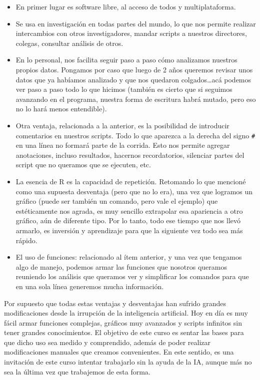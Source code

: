 \documentclass[
]{article}
\providecommand{\tightlist}{%
  \setlength{\itemsep}{0pt}\setlength{\parskip}{0pt}}
\begin{document}
\begin{itemize}
\tightlist
\item
  En primer lugar es software libre, al acceso de todos y
  multiplataforma.
\item
  Se usa en investigación en todas partes del mundo, lo que nos permite
  realizar intercambios con otros investigadores, mandar scripts a
  nuestros directores, colegas, consultar análisis de otros.
\item
  En lo personal, nos facilita seguir paso a paso cómo analizamos
  nuestros propios datos. Pongamos por caso que luego de 2 años queremos
  revisar unos datos que ya habíamos analizado y que nos quedaron
  colgados\ldots acá podemos ver paso a paso todo lo que hicimos
  (también es cierto que si seguimos avanzando en el programa, nuestra
  forma de escritura habrá mutado, pero eso no lo hará menos
  entendible).
\item
  Otra ventaja, relacionada a la anterior, es la posibilidad de
  introducir comentarios en nuestros scripts. Todo lo que aparezca a la
  derecha del signo \texttt{\#} en una línea no formará parte de la
  corrida. Esto nos permite agregar anotaciones, incluso resultados,
  hacernos recordatorios, silenciar partes del script que no queramos
  que se ejecuten, etc.
\item
  La esencia de R es la capacidad de repetición. Retomando lo que
  mencioné como una supuesta desventaja (pero que no lo era), una vez
  que logramos un gráfico (puede ser también un comando, pero vale el
  ejemplo) que estéticamente nos agrada, es muy sencillo extrapolar esa
  apariencia a otro gráfico, aún de diferente tipo. Por lo tanto, todo
  ese tiempo que nos llevó armarlo, es inversión y aprendizaje para que
  la siguiente vez todo sea más rápido.
\item
  El uso de funciones: relacionado al ítem anterior, y una vez que
  tengamos algo de manejo, podemos armar las funciones que nosotros
  queramos reuniendo los análisis que queramos ver y simplificar los
  comandos para que en una sola línea generemos mucha información.
\end{itemize}

Por supuesto que todas estas ventajas y desventajas han sufrido grandes
modificaciones desde la irrupción de la inteligencia artificial. Hoy en
día es muy fácil armar funciones complejas, gráficos muy avanzados y
scripts infinitos sin tener grandes conocimientos. El objetivo de este
curso es sentar las bases para que dicho uso sea medido y comprendido,
además de poder realizar modificaciones manuales que creamos
convenientes. En este sentido, es una invitación de este curso intentar
trabajarlo sin la ayuda de la IA, aunque más no sea la última vez que
trabajemos de esta forma.
\end{document}
